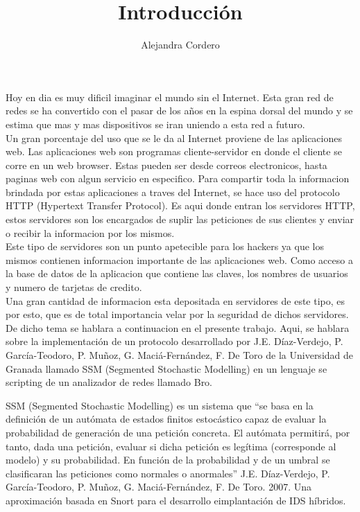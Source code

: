 \documentclass{article}
\title{\textbf{Introducci\'on}}
\author{Alejandra Cordero }
\begin{document}
\maketitle


Hoy en dia es muy dificil imaginar el mundo sin el Internet. Esta gran red de redes se ha convertido con el pasar de los años en la espina dorsal del mundo y se estima que mas y mas dispositivos se iran uniendo a esta red a futuro.\\

Un gran porcentaje del uso que se le da al Internet proviene de las aplicaciones web. Las aplicaciones web son programas cliente-servidor en donde el cliente se corre en un web browser. Estas pueden ser desde correos electronicos, hasta paginas web con algun servicio en especifico. Para compartir toda la informacion brindada por estas aplicaciones a traves del Internet, se hace uso del protocolo HTTP (Hypertext Transfer Protocol). 
Es aqui donde entran los servidores HTTP, estos servidores son los encargados de suplir las peticiones de sus clientes y enviar o recibir la informacion por los mismos.\\

Este tipo de servidores son un punto apetecible para los hackers ya que los mismos contienen informacion importante de las aplicaciones web. Como acceso a la base de datos de la aplicacion que contiene las claves, los nombres de usuarios y numero de tarjetas de credito.\\ 

Una gran cantidad de informacion esta depositada en servidores de este tipo, es por esto, que es de total importancia velar por la seguridad de dichos servidores.\\

De dicho tema se hablara a continuacion en el presente trabajo. Aqui, se hablara sobre la implementación de un protocolo desarrollado por J.E. Díaz-Verdejo, P. García-Teodoro, P. Muñoz, G. Maciá-Fernández, F. De Toro de la Universidad de Granada llamado SSM (Segmented Stochastic Modelling) en un lenguaje se scripting de un analizador de redes llamado Bro.

SSM (Segmented Stochastic Modelling) es un sistema que “se basa en la definición de un autómata de estados finitos estocástico capaz de evaluar la probabilidad de generación de una petición concreta. El autómata permitirá, por tanto, dada una petición, evaluar si dicha petición es legítima (corresponde al modelo) y su probabilidad. En función de la probabilidad y de un umbral se clasificaran las peticiones como normales o anormales” J.E. Díaz-Verdejo, P. García-Teodoro, P. Muñoz, G. Maciá-Fernández, F. De Toro. 2007. Una aproximación basada en Snort para el desarrollo eimplantación de IDS híbridos.\\
\end{document}
